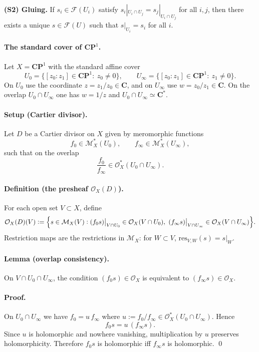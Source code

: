 \documentclass[11pt,openany]{article}
\begin{document}
\noindent\textbf{(S2) Gluing.}
If $s_i\in \mathcal F(U_i)$ satisfy $s_i|_{U_i\cap U_j}=s_j|_{U_i\cap U_j}$ for all $i,j$,
then there exists a unique $s\in \mathcal F(U)$ such that $s|_{U_i}=s_i$ for all $i$.

\paragraph{The standard cover of $\mathbf{CP}^1$.}
Let $X=\mathbf{CP}^1$ with the standard affine cover
\[
U_0=\{[z_0:z_1]\in\mathbf{CP}^1:\ z_0\neq 0\},\qquad
U_\infty=\{[z_0:z_1]\in\mathbf{CP}^1:\ z_1\neq 0\}.
\]
On $U_0$ use the coordinate $z=z_1/z_0\in\mathbf C$, and on $U_\infty$ use $w=z_0/z_1\in\mathbf C$.
On the overlap $U_0\cap U_\infty$ one has $w=1/z$ and $U_0\cap U_\infty\simeq \mathbf C^*$.

\paragraph{Setup (Cartier divisor).}
Let $D$ be a Cartier divisor on $X$ given by meromorphic functions
\[
f_0\in \mathcal M_X^*(U_0),\qquad f_\infty\in \mathcal M_X^*(U_\infty),
\]
such that on the overlap
\[
\frac{f_0}{f_\infty}\in \mathcal O_X^*(U_0\cap U_\infty).
\]

\paragraph{Definition (the presheaf $\mathcal O_X(D)$).}
For each open set $V\subset X$, define
\[
\mathcal O_X(D)(V)
:=
\Bigl\{
s\in \mathcal M_X(V):
(f_0 s)\big|_{V\cap U_0}\in\mathcal O_X(V\cap U_0),\ 
(f_\infty s)\big|_{V\cap U_\infty}\in\mathcal O_X(V\cap U_\infty)
\Bigr\}.
\]
Restriction maps are the restrictions in $\mathcal M_X$: for $W\subset V$,
$\mathrm{res}_{V,W}(s)=s|_W$.

\paragraph{Lemma (overlap consistency).}
On $V\cap U_0\cap U_\infty$, the condition $(f_0 s)\in\mathcal O_X$ is equivalent to
$(f_\infty s)\in\mathcal O_X$.

\paragraph{Proof.}
On $U_0\cap U_\infty$ we have $f_0 = u\, f_\infty$ where
$u:=f_0/f_\infty\in \mathcal O_X^*(U_0\cap U_\infty)$. Hence
\[
f_0 s = u\,(f_\infty s).
\]
Since $u$ is holomorphic and nowhere vanishing, multiplication by $u$ preserves holomorphicity.
Therefore $f_0 s$ is holomorphic iff $f_\infty s$ is holomorphic. \qed
\end{document}
